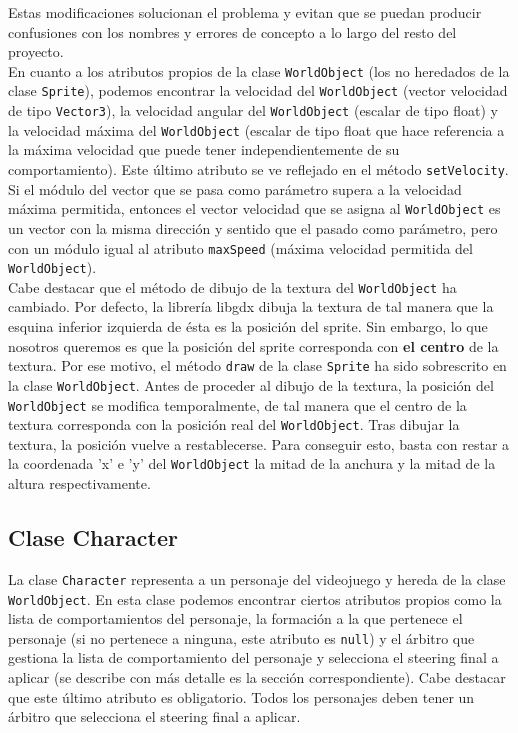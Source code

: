 Estas modificaciones solucionan el problema y evitan que se puedan producir confusiones con los nombres y errores de concepto a lo largo del resto del proyecto. \\

En cuanto a los atributos propios de la clase \texttt{WorldObject} (los no heredados de la clase \texttt{Sprite}), podemos encontrar la velocidad del \texttt{WorldObject} (vector velocidad de tipo \texttt{Vector3}), la velocidad angular del \texttt{WorldObject} (escalar de tipo float) y la velocidad máxima del \texttt{WorldObject} (escalar de tipo float que hace referencia a la máxima velocidad que puede tener independientemente de su comportamiento). Este último atributo se ve reflejado en el método \texttt{setVelocity}. Si el módulo del vector que se pasa como parámetro supera a la velocidad máxima permitida, entonces el vector velocidad que se asigna al \texttt{WorldObject} es un vector con la misma dirección y sentido que el pasado como parámetro, pero con un módulo igual al atributo \texttt{maxSpeed} (máxima velocidad permitida del \texttt{WorldObject}). \\

Cabe destacar que el método de dibujo de la textura del \texttt{WorldObject} ha cambiado. Por defecto, la librería libgdx dibuja la textura de tal manera que la esquina inferior izquierda de ésta es la posición del sprite. Sin embargo, lo que nosotros queremos es que la posición del sprite corresponda con \textbf{el centro} de la textura. Por ese motivo, el método \texttt{draw} de la clase \texttt{Sprite} ha sido sobrescrito en la clase \texttt{WorldObject}. Antes de proceder al dibujo de la textura, la posición del \texttt{WorldObject} se modifica temporalmente, de tal manera que el centro de la textura corresponda con la posición real del \texttt{WorldObject}. Tras dibujar la textura, la posición vuelve a restablecerse. Para conseguir esto, basta con restar a la coordenada 'x' e 'y' del \texttt{WorldObject} la mitad de la anchura y la mitad de la altura respectivamente.


\subsection{Clase Character}

La clase \texttt{Character} representa a un personaje del videojuego y hereda de la clase \texttt{WorldObject}. En esta clase podemos encontrar ciertos atributos propios como la lista de comportamientos del personaje, la formación a la que pertenece el personaje (si no pertenece a ninguna, este atributo es \texttt{null}) y el árbitro que gestiona la lista de comportamiento del personaje y selecciona el steering final a aplicar (se describe con más detalle es la sección correspondiente). Cabe destacar que este último atributo es obligatorio. Todos los personajes deben tener un árbitro que selecciona el steering final a aplicar. \\

